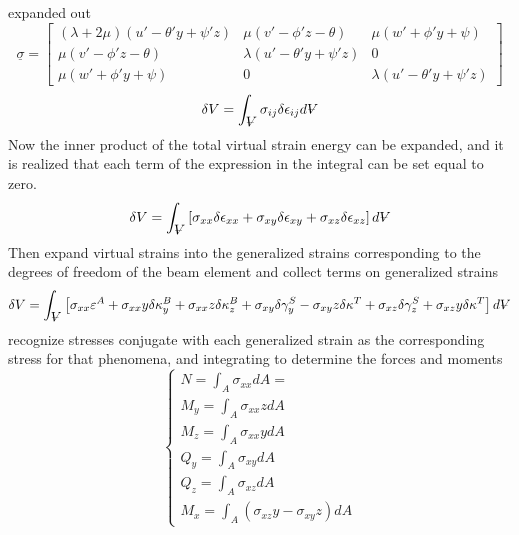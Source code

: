 expanded out 
\begin{equation}\label{StressEvaluated}
\underline{\sigma}=\left[\begin{array}{ccc}
(\lambda+2\mu)(u'-\theta'y+\psi'z)&\mu(v'-\phi'z-\theta)&\mu(w'+\phi'y+\psi)\\
\mu(v'-\phi'z-\theta)&\lambda(u'-\theta'y+\psi'z)&0\\
\mu(w'+\phi'y+\psi)&0&\lambda(u'-\theta'y+\psi'z)
\end{array}\right]
\end{equation}
\begin{equation}\label{eq:TotalVirtualStrainEnergyExpression}
\delta V = \int_{\volume}\sigma_{ij}\delta\epsilon_{ij}d\volume
\end{equation}
Now the inner product of the total virtual strain energy can be expanded, and it is realized that each term of the expression in the integral can be set equal to zero.
\begin{equation}\label{eq:TotalVirtualStrainEnergyExpanded}
\delta V=\int_{\volume}\left[\sigma_{xx}\delta\epsilon_{xx}+\sigma_{xy}\delta\epsilon_{xy}+\sigma_{xz}\delta\epsilon_{xz}\right]d\volume
\end{equation}
Then expand virtual strains into the generalized strains corresponding to the degrees of freedom of the beam element and collect terms on generalized strains
\begin{equation}\label{eq:TotalVirtualStrainEnergyExpandedGeneralized}
\delta V=\int_{\volume}\left[\sigma_{xx}\varepsilon^A+\sigma_{xx}y\delta\kappa^B_y+\sigma_{xx}z\delta\kappa^B_z+\sigma_{xy}\delta\gamma^S_y-\sigma_{xy}z\delta\kappa^T+\sigma_{xz}\delta\gamma^S_z+\sigma_{xz}y\delta\kappa^T\right]d\volume
\end{equation}
recognize stresses conjugate with each generalized strain as the corresponding stress for that phenomena, and integrating to determine the forces and moments
\begin{equation}\label{eq:generalizedForces}
\left\{\begin{array}{l}
N=\int_A\sigma_{xx}dA=\\
M_y=\int_A\sigma_{xx}zdA\\
M_z=\int_A\sigma_{xx}ydA\\
Q_y=\int_A\sigma_{xy}dA\\
Q_z=\int_A\sigma_{xz}dA\\
M_x=\int_A(\sigma_{xz}y-\sigma_{xy}z)dA
\end{array}\right.
\end{equation}


